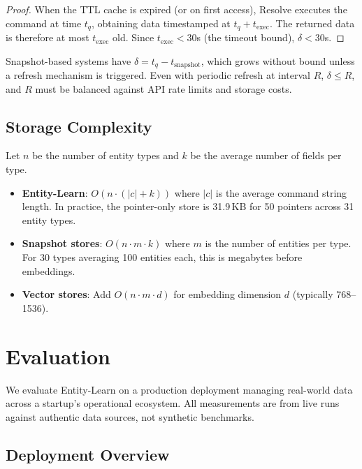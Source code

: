 \documentclass[11pt,twocolumn]{article}
\begin{document}
\begin{proof}
When the TTL cache is expired (or on first access), Resolve executes the command at time $t_q$, obtaining data timestamped at $t_q + t_{\text{exec}}$.
The returned data is therefore at most $t_{\text{exec}}$ old.
Since $t_{\text{exec}} < 30$s (the timeout bound), $\delta < 30$s.
\end{proof}

Snapshot-based systems have $\delta = t_q - t_{\text{snapshot}}$, which grows without bound unless a refresh mechanism is triggered.
Even with periodic refresh at interval $R$, $\delta \leq R$, and $R$ must be balanced against API rate limits and storage costs.

\subsection{Storage Complexity}

Let $n$ be the number of entity types and $k$ be the average number of fields per type.

\begin{itemize}[leftmargin=1.5em,itemsep=2pt]
  \item \textbf{Entity-Learn}: $O(n \cdot (|c| + k))$ where $|c|$ is the average command string length. In practice, the pointer-only store is 31.9\,KB for 50 pointers across 31 entity types.
  \item \textbf{Snapshot stores}: $O(n \cdot m \cdot k)$ where $m$ is the number of entities per type. For 30 types averaging 100 entities each, this is megabytes before embeddings.
  \item \textbf{Vector stores}: Add $O(n \cdot m \cdot d)$ for embedding dimension $d$ (typically 768--1536).
\end{itemize}


\section{Evaluation}
\label{sec:eval}

We evaluate Entity-Learn on a production deployment managing real-world data across a startup's operational ecosystem. All measurements are from live runs against authentic data sources, not synthetic benchmarks.

\subsection{Deployment Overview}
\end{document}
